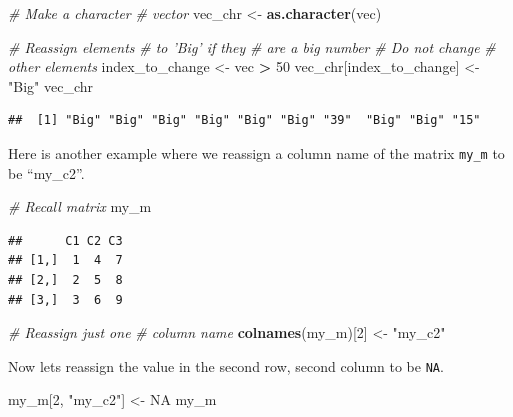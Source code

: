 \documentclass[
]{book}
\newenvironment{Shaded}{\begin{snugshade}}{\end{snugshade}}
\newcommand{\CommentTok}[1]{\textcolor[rgb]{0.56,0.35,0.01}{\textit{#1}}}
\newcommand{\DecValTok}[1]{\textcolor[rgb]{0.00,0.00,0.81}{#1}}
\newcommand{\KeywordTok}[1]{\textcolor[rgb]{0.13,0.29,0.53}{\textbf{#1}}}
\newcommand{\NormalTok}[1]{#1}
\newcommand{\OperatorTok}[1]{\textcolor[rgb]{0.81,0.36,0.00}{\textbf{#1}}}
\newcommand{\OtherTok}[1]{\textcolor[rgb]{0.56,0.35,0.01}{#1}}
\newcommand{\StringTok}[1]{\textcolor[rgb]{0.31,0.60,0.02}{#1}}
\begin{document}
\begin{Shaded}
\begin{Highlighting}[]
\CommentTok{# Make a character}
\CommentTok{# vector}
\NormalTok{vec_chr <-}\StringTok{ }\KeywordTok{as.character}\NormalTok{(vec)}

\CommentTok{# Reassign elements}
\CommentTok{# to 'Big' if they}
\CommentTok{# are a big number}
\CommentTok{# Do not change}
\CommentTok{# other elements}
\NormalTok{index_to_change <-}\StringTok{ }\NormalTok{vec }\OperatorTok{>}
\StringTok{    }\DecValTok{50}
\NormalTok{vec_chr[index_to_change] <-}\StringTok{ "Big"}
\NormalTok{vec_chr}
\end{Highlighting}
\end{Shaded}

\begin{verbatim}
##  [1] "Big" "Big" "Big" "Big" "Big" "Big" "39"  "Big" "Big" "15"
\end{verbatim}

Here is another example where we reassign a column name of the matrix \texttt{my\_m} to be ``my\_c2''.

\begin{Shaded}
\begin{Highlighting}[]
\CommentTok{# Recall matrix}
\NormalTok{my_m}
\end{Highlighting}
\end{Shaded}

\begin{verbatim}
##      C1 C2 C3
## [1,]  1  4  7
## [2,]  2  5  8
## [3,]  3  6  9
\end{verbatim}

\begin{Shaded}
\begin{Highlighting}[]
\CommentTok{# Reassign just one}
\CommentTok{# column name}
\KeywordTok{colnames}\NormalTok{(my_m)[}\DecValTok{2}\NormalTok{] <-}\StringTok{ "my_c2"}
\end{Highlighting}
\end{Shaded}

Now lets reassign the value in the second row, second column to be \texttt{NA}.

\begin{Shaded}
\begin{Highlighting}[]
\NormalTok{my_m[}\DecValTok{2}\NormalTok{, }\StringTok{"my_c2"}\NormalTok{] <-}\StringTok{ }\OtherTok{NA}
\NormalTok{my_m}
\end{Highlighting}
\end{Shaded}
\end{document}
